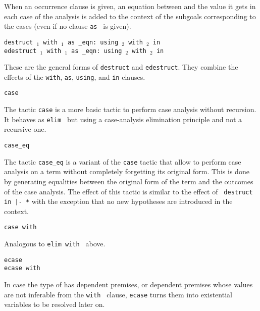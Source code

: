 \begin{coq_example*}
\begin{Variants}
  When an occurrence clause is given, an equation between {\term} and
  the value it gets in each case of the analysis is added to the
  context of the subgoals corresponding to the cases (even
  if no clause {\tt as {\namingintropattern}} is given).

\item{\tt destruct {\term$_1$} with {\bindinglist$_1$} as {\disjconjintropattern} \_eqn: {\namingintropattern}  using {\term$_2$} with {\bindinglist$_2$} in {\occgoalset}}\\
     {\tt edestruct {\term$_1$} with {\bindinglist$_1$} as {\disjconjintropattern} \_eqn: {\namingintropattern} using {\term$_2$} with {\bindinglist$_2$} in {\occgoalset}}

  These are the general forms of {\tt destruct} and {\tt edestruct}.
  They combine the effects of the {\tt with}, {\tt as}, {\tt using},
  and {\tt in} clauses.

\item{\tt case \term}\label{case}

  The tactic {\tt case} is a more basic tactic to perform case
  analysis without recursion. It behaves as {\tt elim \term} but using
  a case-analysis elimination principle and not a recursive one.

\item{\tt case\_eq \term}\label{case_eq}

 The tactic {\tt case\_eq} is a variant of the {\tt case} tactic that
 allow to perform case analysis on a term without completely
 forgetting its original form. This is done by generating equalities
 between the original form of the term and the outcomes of the case
 analysis. The effect of this tactic is similar to the effect of {\tt
 destruct {\term} in |- *} with the exception that no new hypotheses
 are introduced in the context.

\item {\tt case {\term} with {\bindinglist}}

  Analogous to {\tt elim {\term} with {\bindinglist}} above.

\item{\tt ecase {\term}}\\
  {\tt ecase {\term} with {\bindinglist}}

  In case the type of {\term} has dependent premises, or dependent
  premises whose values are not inferable from the {\tt with
  {\bindinglist}} clause, {\tt ecase} turns them into existential
  variables to be resolved later on.


\end{Variants}
\end{coq_example*}
